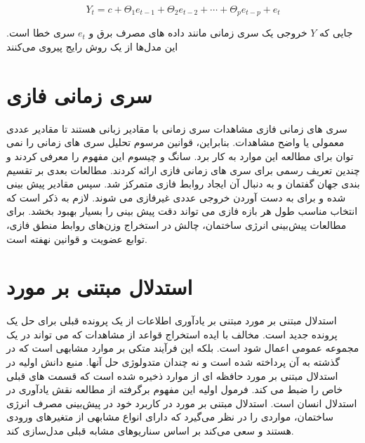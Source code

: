     \begin{equation}\label{eq:q}
        Y_t = c + \Theta_1 e_{t-1} + \Theta_2 e_{t-2} + \cdots + \Theta_p e_{t-p} + e_t
    \end{equation}

    جایی که $Y$ خروجی یک سری زمانی مانند داده های مصرف برق و $e_t$ سری خطا است. این مدل‌ها از یک روش رایج پیروی می‌کنند
\section{سری زمانی فازی}
سری های زمانی فازی مشاهدات سری زمانی با مقادیر زبانی هستند تا مقادیر عددی معمولی یا واضح مشاهدات.
 بنابراین، قوانین مرسوم تحلیل سری های زمانی را نمی توان برای مطالعه این موارد به کار برد. سانگ و چیسوم \cite{song1993fuzzy} این مفهوم را معرفی کردند و چندین تعریف رسمی برای سری های زمانی فازی ارائه کردند. 
 مطالعات بعدی بر تقسیم بندی جهان گفتمان و به دنبال آن ایجاد روابط فازی متمرکز شد. سپس مقادیر پیش بینی شده و برای به دست آوردن خروجی عددی غیرفازی می شوند. 
 لازم به ذکر است که انتخاب مناسب طول هر بازه فازی می تواند دقت پیش بینی را بسیار بهبود بخشد.
  برای مطالعات پیش‌بینی انرژی ساختمان، چالش در استخراج وزن‌های روابط منطق فازی، توابع عضویت و قوانین نهفته است.

\section[استدلال مبتنی بر مورد]{استدلال مبتنی بر مورد\protect{}}
استدلال مبتنی بر مورد مبتنی بر یادآوری اطلاعات از یک پرونده قبلی برای حل یک پرونده جدید است. مخالف با ایده استخراج قواعد از مشاهدات که می تواند در یک مجموعه عمومی اعمال شود است.
 بلکه این فرآیند متکی بر موارد مشابهی است 
 که در گذشته به آن پرداخته شده است و نه چندان متدولوژی حل آنها.
  منبع دانش اولیه در استدلال مبتنی بر مورد حافظه ای از موارد ذخیره شده است که قسمت های قبلی خاص را ضبط می کند\cite{leake1996cbr}. 
 فرمول اولیه این مفهوم برگرفته از مطالعه نقش یادآوری در استدلال انسان است\cite{schank1983dynamic}. 
 استدلال مبتنی بر مورد در کاربرد خود در پیش‌بینی مصرف انرژی ساختمان، مواردی را در نظر می‌گیرد که دارای انواع مشابهی از متغیرهای ورودی هستند
  و سعی می‌کند بر اساس سناریوهای مشابه قبلی مدل‌سازی کند.

